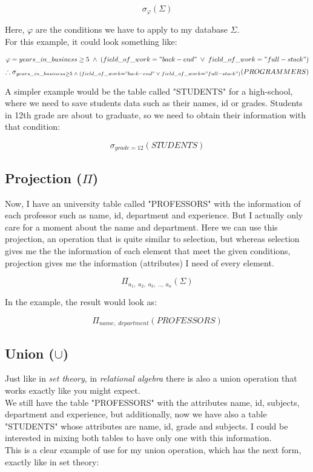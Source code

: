 \documentclass[12pt]{article}
\begin{document}
\[
    \sigma_{\varphi}(\Sigma)
\]

Here, \(\varphi\) are the conditions we have to apply to my database \(\Sigma\).\\
For this example, it could look something like:

\[
\varphi = years\_in\_business \ge 5 \; \wedge \; (field\_of\_work="back-end" \; \vee \; field\_of\_work="full-stack")
\]
\[
    \therefore \sigma_{years\_in\_business \ge 5 \; \wedge \; (field\_of\_work="back-end" \; \vee \; field\_of\_work="full-stack")}(PROGRAMMERS)
\]

A simpler example would be the table called "STUDENTS" for a high-school, where we need to save students data such as their names, id or grades. Students in 12th grade are about to graduate, so we need to obtain their information with that condition:

\[
    \sigma_{grade=12}(STUDENTS)
\]

\subsection{Projection (\(\Pi\))}

Now, I have an university table called "PROFESSORS" with the information of each professor such as name, id, department and experience. But I actually only care for a moment about the name and department. Here we can use this projection, an operation that is quite similar to selection, but whereas selection gives me the the information of each element that meet the given conditions, projection gives me the information (attributes) I need of every element.

\[
    \Pi_{a_1,\;a_2,\;a_3,\;..,\; a_n}(\Sigma)
\]

In the example, the result would look as:

\[
    \Pi_{name,\; department}(PROFESSORS)
\]

\subsection{Union (\(\cup\))}

Just like in \emph{set theory}, in \emph{relational algebra} there is also a union operation that works exactly like you might expect.\\
We still have the table "PROFESSORS" with the attributes name, id, subjects, department and experience, but additionally, now we have also a table "STUDENTS" whose attributes are name, id, grade and subjects. I could be interested in mixing both tables to have only one with this information.\\
This is a clear example of use for my union operation, which has the next form, exactly like in set theory:
\end{document}
